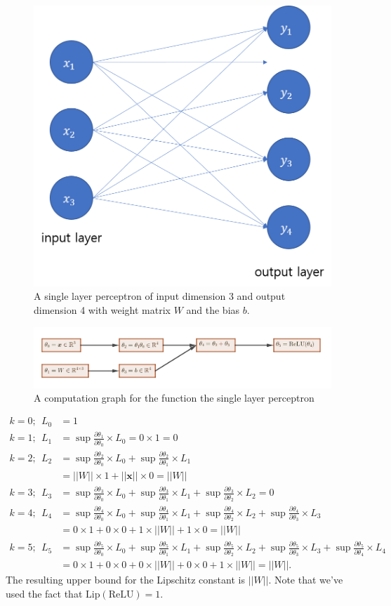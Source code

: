 \documentclass[12pt]{report}
\numberwithin{figure}{chapter}
\theoremstyle{plain}
\theoremstyle{definition}
\theoremstyle{corollary}
\theoremstyle{definition}
\theoremstyle{plain}
\theoremstyle{definition}
\theoremstyle{plain}
\newcommand\bx{\ensuremath{\boldsymbol x}}
\newcommand\lip{\ensuremath{\text{Lip}}}
\begin{document}
\begin{figure}[h]
\centering
\includegraphics[width=.4\textwidth]{SLP}
\caption{A single layer perceptron of input dimension 3 and output dimension 4 with weight matrix \(W\) and the bias \(b\).}
\label{SLP}
\end{figure}

\begin{figure}[h]
\centering
\includegraphics[width=\textwidth]{computation_graph_2}
\caption{A computation graph for the function the single layer perceptron}
\label{computation_graph_2}
\end{figure}

\begin{align*}
k=0;\:\: L_0&=1\\
k=1;\:\: L_1&=\sup\frac{\partial\theta_1}{\partial\theta_0}\times L_0=0\times1=0\\
k=2;\:\: L_2&
=\sup\frac{\partial\theta_2}{\partial\theta_0}\times L_0
+\sup\frac{\partial\theta_2}{\partial\theta_1}\times L_1\\
&=||W||\times1+||\bx||\times0=||W||\\
k=3;\:\: L_3&
=\sup\frac{\partial\theta_3}{\partial\theta_0}\times L_0
+\sup\frac{\partial\theta_3}{\partial\theta_1}\times L_1
+\sup\frac{\partial\theta_3}{\partial\theta_2}\times L_2=0\\
k=4;\:\: L_4&
=\sup\frac{\partial\theta_4}{\partial\theta_0}\times L_0
+\sup\frac{\partial\theta_4}{\partial\theta_1}\times L_1
+\sup\frac{\partial\theta_4}{\partial\theta_2}\times L_2
+\sup\frac{\partial\theta_4}{\partial\theta_3}\times L_3\\
&=0\times1+0\times0+1\times||W||+1\times0=||W||\\
k=5;\:\: L_5&
=\sup\frac{\partial\theta_5}{\partial\theta_0}\times L_0
+\sup\frac{\partial\theta_5}{\partial\theta_1}\times L_1
+\sup\frac{\partial\theta_5}{\partial\theta_2}\times L_2
+\sup\frac{\partial\theta_5}{\partial\theta_3}\times L_3
+\sup\frac{\partial\theta_5}{\partial\theta_4}\times L_4\\
&=0\times1+0\times0+0\times||W||+0\times0+1\times||W||=||W||.
\end{align*}
The resulting upper bound for the Lipschitz constant is \(||W||\).
Note that we've used the fact that \(\lip(\text{ReLU})=1\).
\end{document}
